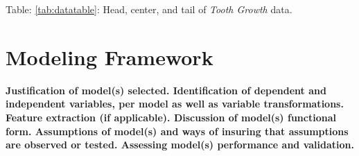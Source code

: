 \documentclass[12pt,oneside]{chicagocapstone}
\begin{document}
Table: \ref{tab:datatable}: Head, center, and tail of \emph{Tooth
Growth} data.

\newpage

\section*{Modeling Framework}\label{methodology-modeling}

\textbf{Justification of model(s) selected. Identification of dependent
and independent variables, per model as well as variable
transformations. Feature extraction (if applicable). Discussion of
model(s) functional form. Assumptions of model(s) and ways of insuring
that assumptions are observed or tested. Assessing model(s) performance
and validation.}
\end{document}
